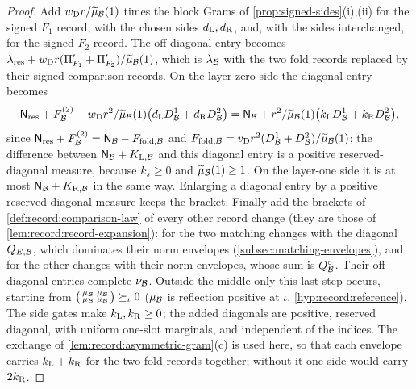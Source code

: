 \begin{proof}
Add $w_{\rm D}r/\widetilde\mu_\mathcal B(1)$ times the block Grams of
\cref{prop:signed-sides}(i),(ii) for the signed $F_1$ record, with the chosen
sides $d_{\rm L},d_{\rm R}$, and, with the sides interchanged, for the signed $F_2$
record. The off-diagonal entry becomes
$\lambda_{\rm res}+w_{\rm D}r(\Pi'_{F_1}+\Pi'_{F_2})/\widetilde\mu_\mathcal B(1)$, which is
$\lambda_\mathcal B$ with the two fold records replaced by their signed comparison
records. On the layer-zero side the diagonal entry becomes
\[
 \mathsf N_{\rm res}+F^{(2)}_\mathcal B+w_{\rm D}r^2/\widetilde\mu_\mathcal B(1)\bigl(d_{\rm
 L}D^1_\mathcal B+d_{\rm R}D^2_\mathcal B\bigr)
 =\mathsf N_\mathcal B+r^2/\widetilde\mu_\mathcal B(1)\bigl(k_{\rm L}D^1_\mathcal B+k_{\rm R}D^2_\mathcal B\bigr),
\]
since $\mathsf N_{\rm res}+F^{(2)}_\mathcal B=\mathsf N_\mathcal B-F_{{\rm fold},\mathcal B}$ and
$F_{{\rm fold},\mathcal B}=v_{\rm D}r^2(D^1_\mathcal B+D^2_\mathcal B)/\widetilde\mu_\mathcal B(1)$; the difference between $\mathsf N_\mathcal B+K_{{\rm L},\mathcal B}$ and this diagonal entry is a positive reserved-diagonal measure,
because $k_s\ge0$ and $\widetilde\mu_\mathcal B(1)\ge1$. On the layer-one side it is at
most $\mathsf N_\mathcal B+K_{{\rm R},\mathcal B}$ in the same way. Enlarging a diagonal entry by a
positive reserved-diagonal measure keeps the bracket. Finally add the brackets
of \cref{def:record:comparison-law} of every other record change (they are
those of \cref{lem:record:record-expansion}): for the two matching changes with
the diagonal $Q_{E,\mathcal B}$, which dominates their norm envelopes
(\cref{subsec:matching-envelopes}), and for the other changes with their norm
envelopes, whose sum is $Q^\circ_\mathcal B$. Their off-diagonal entries complete
$\nu_\mathcal B$. Outside the middle only this last step occurs, starting from
$\bigl(\begin{smallmatrix}\mu_\mathcal B&\mu_\mathcal B\\ \mu_\mathcal B&\mu_\mathcal B
\end{smallmatrix}\bigr)\succeq_\iota0$ ($\mu_\mathcal B$ is reflection positive at
$\iota$, \cref{hyp:record:reference}). The side gates make
$k_{\rm L},k_{\rm R}\ge0$; the added diagonals are positive, reserved diagonal,
with uniform one-slot marginals, and independent of the indices. The exchange
of \cref{lem:record:asymmetric-gram}(c) is used here, so that each envelope
carries $k_{\rm L}+k_{\rm R}$ for the two fold records together; without it one
side would carry $2k_{\rm R}$.


\end{proof}
